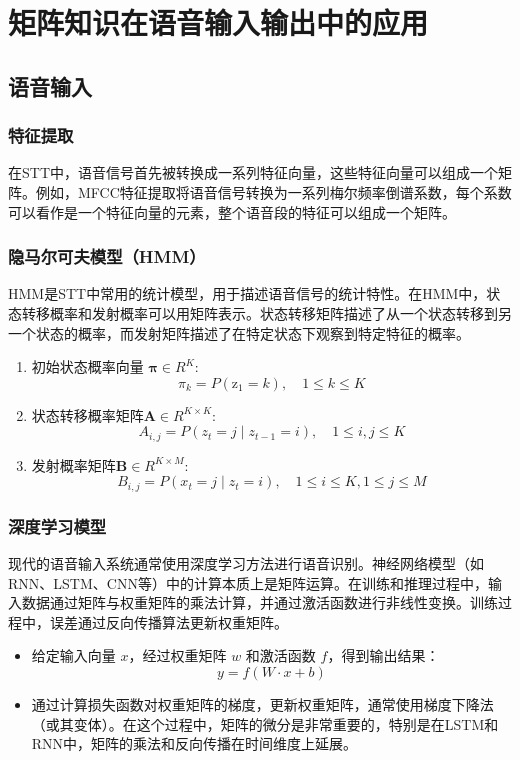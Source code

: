 \documentclass{article}
\begin{document}
\section{矩阵知识在语音输入输出中的应用}
\subsection{语音输入}
\subsubsection{特征提取}{在STT中，语音信号首先被转换成一系列特征向量，这些特征向量可以组成一个矩阵。例如，MFCC特征提取将语音信号转换为一系列梅尔频率倒谱系数，每个系数可以看作是一个特征向量的元素，整个语音段的特征可以组成一个矩阵。}
\subsubsection{隐马尔可夫模型（HMM）}{HMM是STT中常用的统计模型，用于描述语音信号的统计特性。在HMM中，状态转移概率和发射概率可以用矩阵表示。状态转移矩阵描述了从一个状态转移到另一个状态的概率，而发射矩阵描述了在特定状态下观察到特定特征的概率。
\begin{enumerate}
    \item 初始状态概率向量 $\mathbf{\pi} \in R^K :$
    $$\pi_{k}=P(\mathrm{z}_{1}=k),\quad1\leq k\leq K$$
    \item 状态转移概率矩阵$\mathbf{A}\in R^{K\times K}:$
$$A_{i,j}=P(z_{t}=j\mid z_{t-1}=i),\quad1\leq i,j\leq K$$
    \item 发射概率矩阵$\mathbf{B}\in R^{K\times M}:$
    $$B_{i,j}=P(x_{t}=j\mid z_{t}=i),\quad1\leq i\leq K,1\leq j\leq M$$
\end{enumerate}
}
\subsubsection{深度学习模型}{现代的语音输入系统通常使用深度学习方法进行语音识别。神经网络模型（如RNN、LSTM、CNN等）中的计算本质上是矩阵运算。在训练和推理过程中，输入数据通过矩阵与权重矩阵的乘法计算，并通过激活函数进行非线性变换。训练过程中，误差通过反向传播算法更新权重矩阵。
\begin{itemize}
    \item 给定输入向量 $x$，经过权重矩阵 $w$ 和激活函数 $f$，得到输出结果：
    $$y=f(W \cdot x+b)
    $$
    \item 通过计算损失函数对权重矩阵的梯度，更新权重矩阵，通常使用梯度下降法（或其变体）。在这个过程中，矩阵的微分是非常重要的，特别是在LSTM和RNN中，矩阵的乘法和反向传播在时间维度上延展。
\end{itemize}
}
\end{document}
